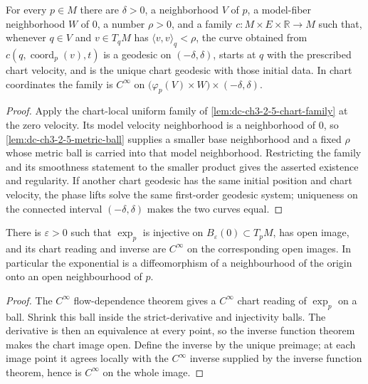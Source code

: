 \begin{lemma}
  \label{lem:dc-ch3-2-5-metric-family}


  For every $p\in M$ there are $\delta>0$, a neighborhood $V$ of $p$,
  a model-fiber neighborhood $W$ of $0$, a number $\rho>0$, and a family
  $c:M\times E\times\mathbb R\to M$ such that, whenever $q\in V$ and
  $v\in T_qM$ has $\langle v,v\rangle_q<\rho$, the curve obtained from
  $c(q,\operatorname{coord}_p(v),t)$ is a geodesic on $(-\delta,\delta)$,
  starts at $q$ with the prescribed chart velocity, and is the unique chart
  geodesic with those initial data.  In chart coordinates the family is
  $C^\infty$ on $\bigl(\varphi_p(V)\times W\bigr)\times(-\delta,\delta)$.
\end{lemma}
\begin{proof}

  Apply the chart-local uniform family of
  \cref{lem:dc-ch3-2-5-chart-family} at the zero velocity.  Its model velocity
  neighborhood is a neighborhood of $0$, so
  \cref{lem:dc-ch3-2-5-metric-ball} supplies a smaller base neighborhood and a
  fixed $\rho$ whose metric ball is carried into that model neighborhood.
  Restricting the family and its smoothness statement to the smaller product
  gives the asserted existence and regularity.  If another chart geodesic has
  the same initial position and chart velocity, the phase lifts solve the same
  first-order geodesic system; uniqueness on the connected interval
  $(-\delta,\delta)$ makes the two curves equal.
\end{proof}

\begin{lemma}
  \label{lem:dc-ch3-2-9-cinfty}


  There is $\varepsilon>0$ such that $\exp_p$ is injective on
  $B_\varepsilon(0)\subset T_pM$, has open image, and its chart reading and
  inverse are $C^\infty$ on the corresponding open images. In particular the
  exponential is a diffeomorphism of a neighbourhood of the origin onto an
  open neighbourhood of $p$.
\end{lemma}
\begin{proof}

  The $C^\infty$ flow-dependence theorem gives a $C^\infty$ chart reading of
  $\exp_p$ on a ball. Shrink this ball inside the strict-derivative and
  injectivity balls. The derivative is then an equivalence at every point, so
  the inverse function theorem makes the chart image open. Define the inverse
  by the unique preimage; at each image point it agrees locally with the
  $C^\infty$ inverse supplied by the inverse function theorem, hence is
  $C^\infty$ on the whole image.
\end{proof}

